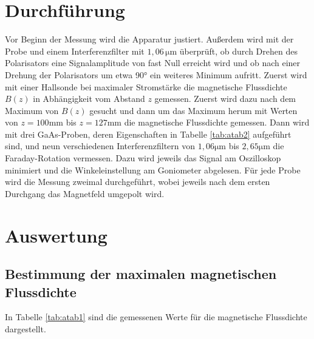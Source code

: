 \section{Durchführung}
Vor Beginn der Messung wird die Apparatur justiert. Außerdem wird mit der Probe und einem Interferenzfilter mit 
$1,06\, \si{\micro \meter}$ überprüft, ob durch Drehen des Polarisators eine Signalamplitude von fast Null erreicht wird 
und ob nach einer Drehung der Polarisators um etwa 90° ein weiteres Minimum aufritt.
Zuerst wird mit einer Hallsonde bei maximaler Stromstärke die magnetische Flussdichte $B(z)$ in Abhängigkeit vom 
Abstand $z$ gemessen. Zuerst wird dazu nach dem Maximum von $B(z)$ gesucht und dann um das Maximum herum mit Werten 
von $z = 100 \si{\milli\meter}$ bis $z = 127 \si{\milli\meter}$ die magnetische Flussdichte gemessen.
Dann wird mit drei GaAs-Proben, deren Eigenschaften in Tabelle \ref{tab:atab2} aufgeführt sind, und neun verschiedenen 
Interferenzfiltern von $1,06 \si{\micro \meter}$ bis $2,65 \si{\micro \meter}$ die Faraday-Rotation vermessen.
Dazu wird jeweils das Signal am Oszilloskop minimiert und die Winkeleinstellung am Goniometer abgelesen. Für jede Probe 
wird die Messung zweimal durchgeführt, wobei jeweils nach dem ersten Durchgang das Magnetfeld umgepolt wird.

\section{Auswertung}
\subsection{Bestimmung der maximalen magnetischen Flussdichte}
In Tabelle \ref{tab:atab1} sind die gemessenen Werte für die magnetische Flussdichte dargestellt. 

